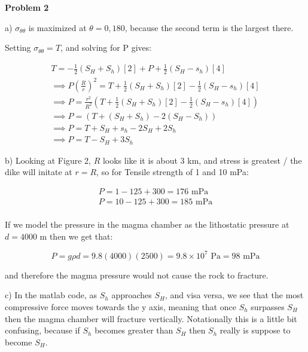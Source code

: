 \documentclass{article}
\begin{document}
\noindent\textbf{Problem 2}

\noindent a) $\sigma_{\theta\theta}$ is maximized at $\theta = 0, 180$, because the second term is the largest there.

\noindent Setting $\sigma_{\theta\theta} = T$, and solving for P gives:

\begin{gather*}
  T = -\frac{1}{2}(S_H + S_h)\left[2\right]+ P + \frac{1}{2}(S_H - s_h)\left[ 4\right]\\
  \implies P\left(\frac{R}{r}\right)^2 = T + \frac{1}{2}(S_H + S_h)\left[ 2\right] -  \frac{1}{2}(S_H - s_h)\left[4\right]\\
  \implies P = \frac{r^2}{R^2} \left(T + \frac{1}{2}(S_H + S_h)\left[ 2\right] -  \frac{1}{2}(S_H - s_h)\left[ 4\right]\right)\\
  \implies P =  \left(T + (S_H + S_h) -  2(S_H - S_h)\right)\\
  \implies P =  T + S_H + s_h -2S_H + 2S_h\\
  \implies P = T - S_H + 3S_h
\end{gather*}


\vspace{3mm}

\noindent b) Looking at Figure 2, $R$ looks like it is about 3 km, and stress is greatest / the dike will initate at $r = R$, so for Tensile strength of 1 and 10 mPa:

\begin{gather*}
  P = 1 - 125 + 300 = 176 \text{ mPa}\\
  P = 10 -125 + 300 = 185 \text{ mPa}\\
\end{gather*}
 
\noindent If we model the pressure in the magma chamber as the lithostatic pressure at $d=4000\text{ m}$ then  we get that:

$$P = g\rho d = 9.8(4000)(2500) = 9.8\times10^7 \text{ Pa} = 98 \text{ mPa}$$

and therefore the magma pressure would not cause the rock to fracture.


\vspace{3mm}

\noindent c) In the matlab code, as $S_h$ approaches $S_H$, and visa versa, we see that the most compressive force moves towards the y axis, meaning that once $S_h$ surpasses $S_H$ then the magma chamber will fracture vertically. Notationally this is a little  bit confusing, because if $S_h$ becomes greater than $S_H$ then $S_h$ really is suppose to become $S_H$.
\end{document}
